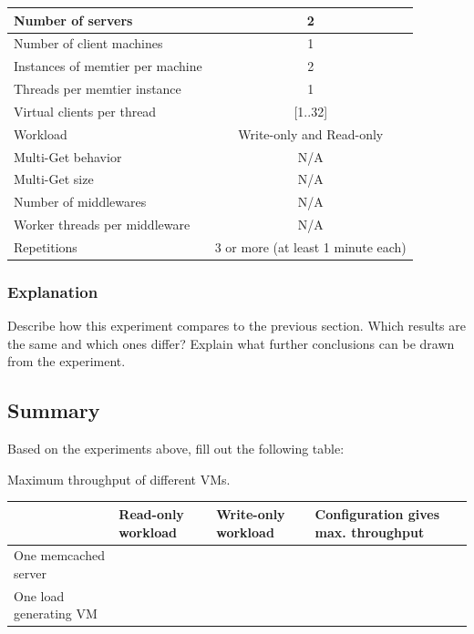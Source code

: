 \documentclass[11pt,a4paper]{article}
\begin{document}
\begin{center}
	\scriptsize{
		\begin{tabular}{|l|c|}
			\hline Number of servers                & 2                        \\
			\hline Number of client machines        & 1                        \\
			\hline Instances of memtier per machine & 2                        \\
			\hline Threads per memtier instance     & 1                        \\
			\hline Virtual clients per thread       & [1..32]                  \\
			\hline Workload                         & Write-only and Read-only \\
			\hline Multi-Get behavior               & N/A                      \\
			\hline Multi-Get size                   & N/A                      \\
			\hline Number of middlewares            & N/A                      \\
			\hline Worker threads per middleware    & N/A                      \\
			\hline Repetitions                      & 3 or more (at least 1 minute each)                \\
			\hline
		\end{tabular}
	}
\end{center}

\subsubsection{Explanation}

Describe how this experiment compares to the previous section. Which results are the same and which ones differ? Explain what further conclusions can be drawn from the experiment.


\subsection{Summary}

Based on the experiments above, fill out the following table:

\begin{center}
	{Maximum throughput of different VMs.}
	\begin{tabular}{|l|p{2cm}|p{2cm}|p{4cm}|}
		\hline                        & Read-only workload & Write-only workload & Configuration gives max. throughput \\
		\hline One memcached server   &                    &                     &                                     \\
		\hline One load generating VM &                    &                     &                                     \\
		\hline
	\end{tabular}
\end{center}
\end{document}
